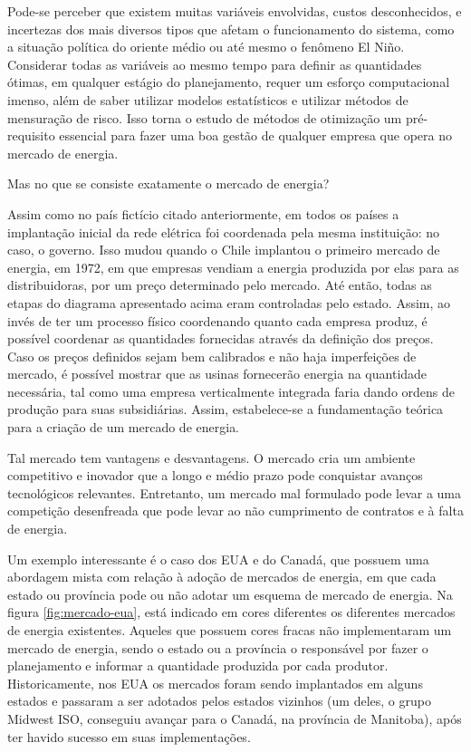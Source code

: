 Pode-se perceber que existem muitas variáveis envolvidas, custos desconhecidos,
e incertezas dos mais diversos tipos que afetam o funcionamento do
sistema, como a situação política do oriente médio ou até mesmo o
fenômeno El Niño. Considerar todas as variáveis ao mesmo tempo para
definir as quantidades ótimas, em qualquer estágio do planejamento,
requer um esforço computacional imenso, além de saber utilizar modelos estatísticos e utilizar métodos de mensuração de risco. Isso torna o estudo de métodos
de otimização um pré-requisito essencial para fazer uma boa gestão
de qualquer empresa que opera no mercado de energia.

Mas no que se consiste exatamente o mercado de energia?


Assim como no país fictício citado anteriormente, em todos os países a implantação inicial
da rede elétrica foi coordenada pela mesma instituição:
no caso, o governo. Isso mudou quando o Chile implantou o primeiro mercado de energia, em 1972, em que empresas vendiam a energia produzida por elas para as distribuidoras, por um preço determinado pelo mercado. Até então, todas as etapas do diagrama apresentado acima eram controladas pelo estado.
Assim, ao invés de ter um processo físico coordenando quanto cada empresa produz, é possível coordenar as quantidades fornecidas através da definição dos preços.
Caso os preços definidos sejam bem calibrados e não haja imperfeições
de mercado, é possível mostrar que as usinas fornecerão energia na
quantidade necessária, tal como uma empresa verticalmente integrada
faria dando ordens de produção para suas subsidiárias. Assim, estabelece-se
a fundamentação teórica para a criação de um mercado de energia.

Tal mercado tem vantagens e desvantagens. O mercado cria um ambiente competitivo e inovador que a longo e médio prazo pode conquistar avanços tecnológicos relevantes. Entretanto, um mercado mal formulado pode levar a uma competição desenfreada que pode levar ao não cumprimento de contratos e à falta de energia. 

Um exemplo interessante é o caso dos EUA e do Canadá, que possuem uma abordagem mista com relação à adoção de mercados de energia, em que cada estado ou província pode ou não adotar um esquema de mercado de energia. Na figura \ref{fig:mercado-eua}, está indicado em cores diferentes os diferentes mercados de energia existentes. Aqueles que possuem cores fracas não implementaram um mercado de energia, sendo o estado ou a província o responsável por fazer o planejamento e informar a quantidade produzida por cada produtor. Historicamente, nos EUA os mercados foram sendo implantados em alguns estados e passaram a ser adotados pelos estados vizinhos (um deles, o grupo Midwest ISO, conseguiu avançar para o Canadá, na província de Manitoba), após ter havido sucesso em suas implementações.  

